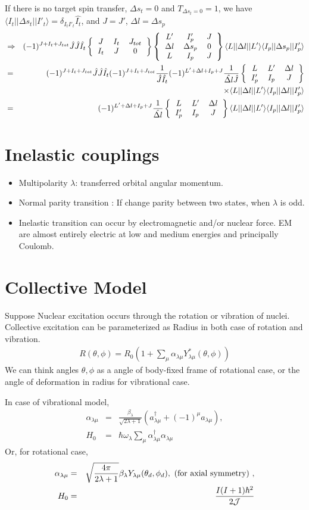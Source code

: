 \documentclass[11pt]{book}
\def\la{\langle}
\def\ra{\rangle}
\newcommand{\bea}{\begin{eqnarray}}
\newcommand{\eea}{\end{eqnarray}}
\newcommand{\no}{\nonumber \\}
\newcommand{\sixjsymbol}[6]{\left\{\begin{tabular}{ccc} {$#1$}&{$#2$}&{$#3$}\\
                             {$#4$}&{$#5$}&{$#6$} \end{tabular}\right\}}
\newcommand{\ninejsymbol}[9]{\left\{\begin{tabular}{ccc}
                             {$#1$}&{$#2$}&{$#3$}\\
                             {$#4$}&{$#5$}&{$#6$}\\
                             {$#7$}&{$#8$}&{$#9$}\end{tabular}\right\}}
\begin{document}
If there is no target spin transfer, $\Delta s_t=0$ and $T_{\Delta s_t=0}=1$,
we have $\la I_t|| \Delta s_t || I'_t\ra =\delta_{I_t I'_t}\hat{I_t}$,
and $J=J'$, $\Delta l=\Delta s_p$
\bea 
&\Rightarrow & (-1)^{J+I_t+J_{tot}} \hat{J}\hat{J}\hat{I_t} 
\sixjsymbol{J}{I_t}{J_{tot}}{I_t}{J}{0} 
\ninejsymbol{L'}{I'_p}{J}{\Delta l}{\Delta s_p}{0}{L}{I_p}{J} 
\la L||\Delta l||L'\ra \la I_p||\Delta s_p||I'_p\ra \no 
&=& (-1)^{J+I_t+J_{tot}} \hat{J}\hat{J}\hat{I_t} 
    (-1)^{J+I_t+J_{tot}}\frac{1}{\hat{J}\hat{I_t}} 
    (-1)^{L'+\Delta l+I_p+J}\frac{1}{\hat{\Delta l}\hat{J}}
    \sixjsymbol{L}{L'}{\Delta l}{I'_p}{I_p}{J}
    \no & &\times  
    \la L||\Delta l||L'\ra \la I_p||\Delta l||I'_p\ra \no 
&=& (-1)^{L'+\Delta l+I_p+J}\frac{1}{\hat{\Delta l}}
\sixjsymbol{L}{L'}{\Delta l}{I'_p}{I_p}{J}
\la L||\Delta l||L'\ra \la I_p||\Delta l||I'_p\ra    
\eea 

\section{Inelastic couplings}
\begin{itemize}
	\item Multipolarity $\lambda$: transferred orbital angular momentum.  
	\item Normal parity transition : If change parity between two states, when $\lambda$ is odd. 
	\item Inelastic transition can occur by electromagnetic and/or nuclear force. 
	      EM are almost entirely electric at low and medium energies and principally Coulomb. 
\end{itemize}

\section{Collective Model}

Suppose Nuclear excitation occurs through the rotation or vibration
of nuclei. Collective excitation can be parameterized as
Radius in both case of rotation and vibration. 
\bea 
R(\theta,\phi)=R_0 (1+\sum_\mu \alpha_{\lambda\mu} Y^*_{\lambda\mu}(\theta,\phi) )
\eea 
We can think angles $\theta,\phi$ as a angle of body-fixed frame
of rotational case, or the angle of deformation in radius for vibrational case.

In case of vibrational model,
\bea 
\alpha_{\lambda\mu}&=&\frac{\beta_\lambda}{\sqrt{2\lambda+1}}( a^\dagger_{\lambda\mu}+(-1)^\mu a_{\lambda\mu}),\no 
H_0&=&\hbar\omega_\lambda\sum_\mu \alpha^\dagger_{\lambda\mu}\alpha_{\lambda\mu} 
\eea 
Or, for rotational case,
\bea 
\alpha_{\lambda \mu}&=&\sqrt{\frac{4\pi}{2\lambda+1}}\beta_\lambda Y_{\lambda\mu}(\theta_d,\phi_d),\mbox{ (for axial symmetry) },\no 
H_0&=&\frac{I(I+1)\hbar^2}{2{\cal J}}
\eea 
\end{document}
